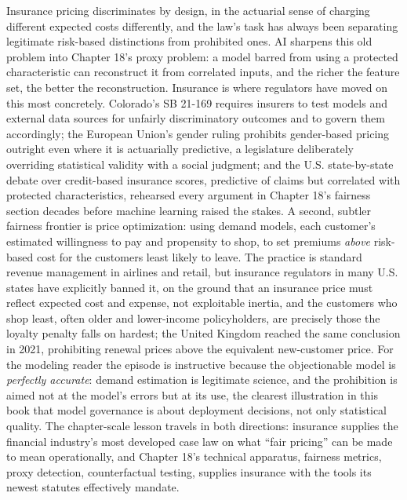 \documentclass[../ai_in_finance]{subfiles}
\begin{document}
Insurance pricing discriminates by design, in the actuarial sense of charging different expected costs differently, and the law's task has always been separating legitimate risk-based distinctions from prohibited ones. AI sharpens this old problem into Chapter 18's proxy problem: a model barred from using a protected characteristic can reconstruct it from correlated inputs, and the richer the feature set, the better the reconstruction. Insurance is where regulators have moved on this most concretely. Colorado's SB 21-169 requires insurers to test models and external data sources for unfairly discriminatory outcomes and to govern them accordingly; the European Union's gender ruling prohibits gender-based pricing outright even where it is actuarially predictive, a legislature deliberately overriding statistical validity with a social judgment; and the U.S. state-by-state debate over credit-based insurance scores, predictive of claims but correlated with protected characteristics, rehearsed every argument in Chapter 18's fairness section decades before machine learning raised the stakes. A second, subtler fairness frontier is price optimization: using demand models, each customer's estimated willingness to pay and propensity to shop, to set premiums \emph{above} risk-based cost for the customers least likely to leave. The practice is standard revenue management in airlines and retail, but insurance regulators in many U.S. states have explicitly banned it, on the ground that an insurance price must reflect expected cost and expense, not exploitable inertia, and the customers who shop least, often older and lower-income policyholders, are precisely those the loyalty penalty falls on hardest; the United Kingdom reached the same conclusion in 2021, prohibiting renewal prices above the equivalent new-customer price. For the modeling reader the episode is instructive because the objectionable model is \emph{perfectly accurate}: demand estimation is legitimate science, and the prohibition is aimed not at the model's errors but at its use, the clearest illustration in this book that model governance is about deployment decisions, not only statistical quality. The chapter-scale lesson travels in both directions: insurance supplies the financial industry's most developed case law on what ``fair pricing'' can be made to mean operationally, and Chapter 18's technical apparatus, fairness metrics, proxy detection, counterfactual testing, supplies insurance with the tools its newest statutes effectively mandate.
\end{document}

